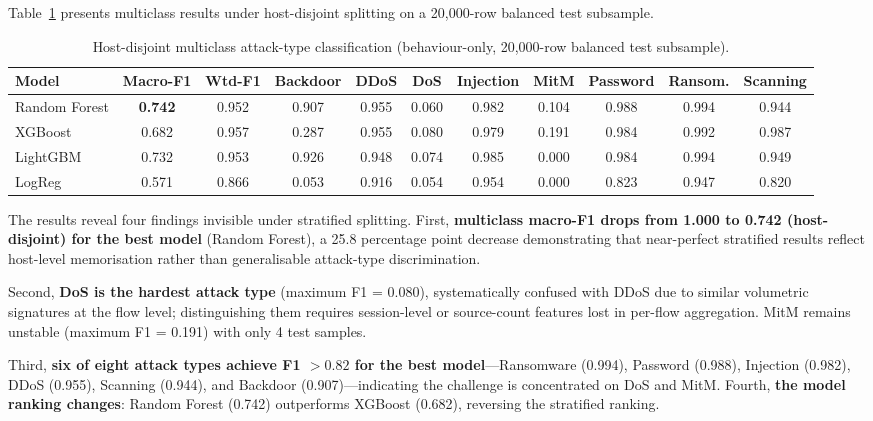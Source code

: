 \documentclass[12pt,a4paper]{report}
\begin{document}
Table~\ref{tab:host-multiclass} presents multiclass results under host-disjoint splitting on a 20,000-row balanced test subsample.

\begin{table}[H]
\centering
\caption{Host-disjoint multiclass attack-type classification (behaviour-only, 20,000-row balanced test subsample).}
\label{tab:host-multiclass}
\small
\begin{tabular}{lcccccccccc}
\toprule
\textbf{Model} & \textbf{Macro-F1} & \textbf{Wtd-F1} & \textbf{Backdoor} & \textbf{DDoS} & \textbf{DoS} & \textbf{Injection} & \textbf{MitM} & \textbf{Password} & \textbf{Ransom.} & \textbf{Scanning} \\
\midrule
Random Forest & \textbf{0.742} & 0.952 & 0.907 & 0.955 & 0.060 & 0.982 & 0.104 & 0.988 & 0.994 & 0.944 \\
XGBoost & 0.682 & 0.957 & 0.287 & 0.955 & 0.080 & 0.979 & 0.191 & 0.984 & 0.992 & 0.987 \\
LightGBM & 0.732 & 0.953 & 0.926 & 0.948 & 0.074 & 0.985 & 0.000 & 0.984 & 0.994 & 0.949 \\
LogReg & 0.571 & 0.866 & 0.053 & 0.916 & 0.054 & 0.954 & 0.000 & 0.823 & 0.947 & 0.820 \\
\bottomrule
\end{tabular}
\end{table}

The results reveal four findings invisible under stratified splitting. First, \textbf{multiclass macro-F1 drops from 1.000 to 0.742 (host-disjoint) for the best model} (Random Forest), a 25.8 percentage point decrease demonstrating that near-perfect stratified results reflect host-level memorisation rather than generalisable attack-type discrimination.

Second, \textbf{DoS is the hardest attack type} (maximum F1 = 0.080), systematically confused with DDoS due to similar volumetric signatures at the flow level; distinguishing them requires session-level or source-count features lost in per-flow aggregation. MitM remains unstable (maximum F1 = 0.191) with only 4 test samples.

Third, \textbf{six of eight attack types achieve F1 $> 0.82$ for the best model}---Ransomware (0.994), Password (0.988), Injection (0.982), DDoS (0.955), Scanning (0.944), and Backdoor (0.907)---indicating the challenge is concentrated on DoS and MitM. Fourth, \textbf{the model ranking changes}: Random Forest (0.742) outperforms XGBoost (0.682), reversing the stratified ranking.
\end{document}
